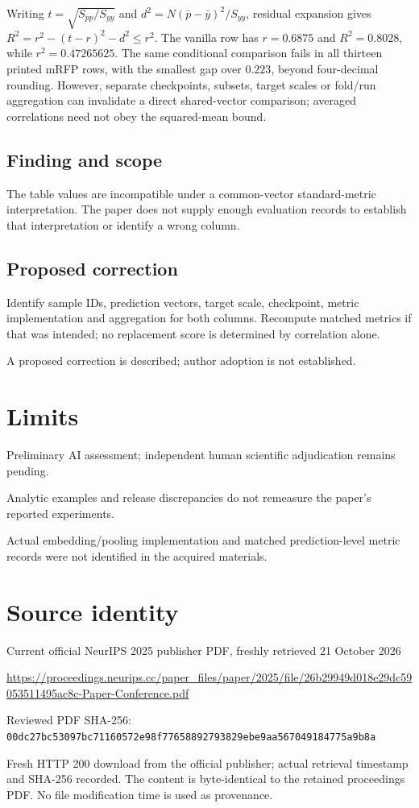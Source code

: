 \documentclass[11pt]{article}
\begin{document}
Writing \(t=\sqrt{S_{pp}/S_{yy}}\) and \(d^2=N(\bar p-\bar y)^2/S_{yy}\), residual expansion gives \(R^2=r^2-(t-r)^2-d^2\le r^2\). The vanilla row has \(r=0.6875\) and \(R^2=0.8028\), while \(r^2=0.47265625\). The same conditional comparison fails in all thirteen printed mRFP rows, with the smallest gap over \(0.223\), beyond four-decimal rounding. However, separate checkpoints, subsets, target scales or fold/run aggregation can invalidate a direct shared-vector comparison; averaged correlations need not obey the squared-mean bound.

\subsection*{Finding and scope}

The table values are incompatible under a common-vector standard-metric interpretation. The paper does not supply enough evaluation records to establish that interpretation or identify a wrong column.

\subsection*{Proposed correction}

Identify sample IDs, prediction vectors, target scale, checkpoint, metric implementation and aggregation for both columns. Recompute matched metrics if that was intended; no replacement score is determined by correlation alone.

A proposed correction is described; author adoption is not established.

\section*{Limits}

Preliminary AI assessment; independent human scientific adjudication remains pending.\par

Analytic examples and release discrepancies do not remeasure the paper’s reported experiments.\par

Actual embedding/pooling implementation and matched prediction-level metric records were not identified in the acquired materials.\par

\section*{Source identity}

Current official NeurIPS 2025 publisher PDF, freshly retrieved 21 October 2026

\url{https://proceedings.neurips.cc/paper_files/paper/2025/file/26b29949d018e29dc59053511495ac8c-Paper-Conference.pdf}

Reviewed PDF SHA-256: \nolinkurl{00dc27bc53097bc71160572e98f77658892793829ebe9aa567049184775a9b8a}

Fresh HTTP 200 download from the official publisher; actual retrieval timestamp and SHA-256 recorded. The content is byte-identical to the retained proceedings PDF. No file modification time is used as provenance.
\end{document}
